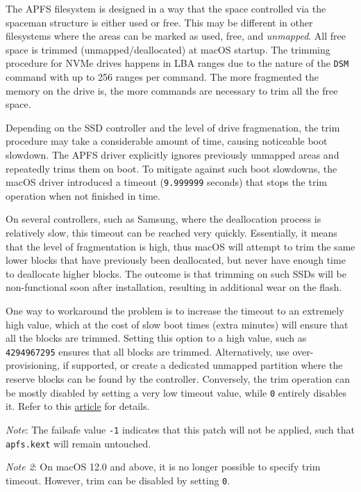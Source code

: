 \documentclass[]{article}
\begin{document}
\begin{enumerate}
  The APFS filesystem is designed in a way that the space controlled via
  the spaceman structure is either used or free. This may be different in
  other filesystems where the areas can be marked as used, free, and
  \emph{unmapped}. All free space is trimmed (unmapped/deallocated)
  at macOS startup. The trimming procedure for NVMe drives happens
  in LBA ranges due to the nature of the \texttt{DSM} command with
  up to 256 ranges per command. The more fragmented the memory
  on the drive is, the more commands are necessary to trim
  all the free space.

  Depending on the SSD controller and the level of drive fragmenation, the trim
  procedure may take a considerable amount of time, causing noticeable boot slowdown.
  The APFS driver explicitly ignores previously unmapped areas and repeatedly trims
  them on boot. To mitigate against such boot slowdowns, the macOS driver introduced a
  timeout (\texttt{9.999999} seconds) that stops the trim operation when not finished in
  time.

  On several controllers, such as Samsung, where the deallocation process is relatively slow,
  this timeout can be reached very quickly. Essentially, it means that the level of
  fragmentation is high, thus macOS will attempt to trim the same lower blocks that
  have previously been deallocated, but never have enough time to deallocate higher
  blocks. The outcome is that trimming on such SSDs will be non-functional soon
  after installation, resulting in additional wear on the flash.

  One way to workaround the problem is to increase the timeout to an extremely
  high value, which at the cost of slow boot times (extra minutes) will
  ensure that all the blocks are trimmed. Setting this option to a high value,
  such as \texttt{4294967295} ensures that all blocks are trimmed.
  Alternatively, use over-provisioning, if supported, or create
  a dedicated unmapped partition where the reserve blocks can be found
  by the controller. Conversely, the trim operation can be mostly disabled by
  setting a very low timeout value, while \texttt{0} entirely disables it. Refer to this
  \href{https://interface31.ru/tech_it/2015/04/mozhno-li-effektivno-ispolzovat-ssd-bez-podderzhki-trim.html}{article}
  for details.

  \emph{Note}: The failsafe value \texttt{-1} indicates that this patch will not be applied,
  such that \texttt{apfs.kext} will remain untouched.

  \emph{Note 2}: On macOS 12.0 and above, it is no longer possible to specify trim timeout.
  However, trim can be disabled by setting \texttt{0}.


\end{enumerate}
\end{document}
